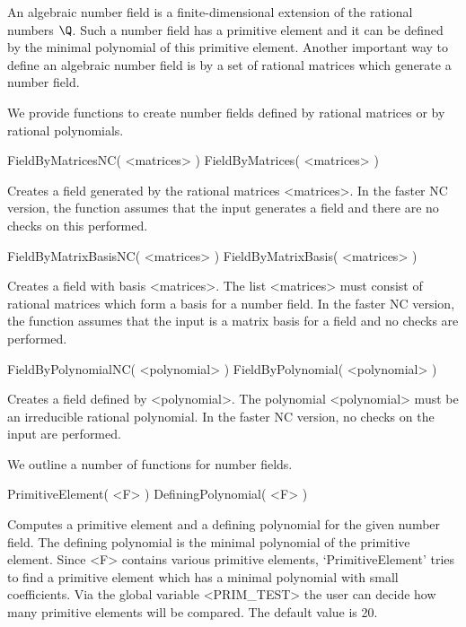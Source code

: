 

An algebraic number field is a finite-dimensional extension of the
rational numbers $\Q$. Such a number field has a primitive element 
and it can be defined by the minimal polynomial of  this primitive
element. Another important way to define an algebraic number field
is by a set of rational matrices which generate a number field.


We provide functions to create number fields defined by rational 
matrices or by rational polynomials.

\> FieldByMatricesNC( <matrices> )
\> FieldByMatrices( <matrices> )

Creates a field generated by the rational matrices <matrices>. In 
the faster NC version, the function assumes that the input generates 
a field and there are no checks on this performed. 

\> FieldByMatrixBasisNC( <matrices> )
\> FieldByMatrixBasis( <matrices> )

Creates a field with basis <matrices>. The list <matrices> must consist 
of rational matrices which form a basis for a number field. In the faster
NC version, the function assumes that the input is a matrix basis for a
field and no checks are performed.

\> FieldByPolynomialNC( <polynomial> )
\> FieldByPolynomial( <polynomial> )

Creates a field defined by <polynomial>. The polynomial <polynomial>
must be an irreducible rational polynomial. In the faster NC version,
no checks on the input are performed.


We outline a number of functions for number fields.

\> PrimitiveElement( <F> )
\> DefiningPolynomial( <F> )

Computes a primitive element and a defining polynomial for the given number
field. The defining polynomial is the minimal polynomial of the primitive
element. Since <F> contains various primitive elements, 
`PrimitiveElement' tries to find a primitive element which has a
minimal polynomial with small coefficients. Via the global variable
<PRIM_TEST> the user can decide how many primitive elements will be
compared. The default value is 20.

